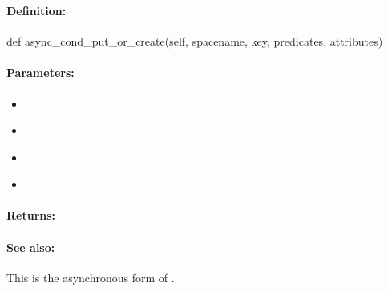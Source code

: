 \pagebreak
\subsubsection{}
\label{api:python:async_cond_put_or_create}


\paragraph{Definition:}
\begin{pythoncode}
def async_cond_put_or_create(self, spacename, key, predicates, attributes)
\end{pythoncode}

\paragraph{Parameters:}
\begin{itemize}[noitemsep]
\item {}\\

\item {}\\

\item {}\\

\item {}\\

\end{itemize}

\paragraph{Returns:}


\paragraph{See also:}  This is the asynchronous form of .

\pagebreak
\subsubsection{}
\label{api:python:group_put}


